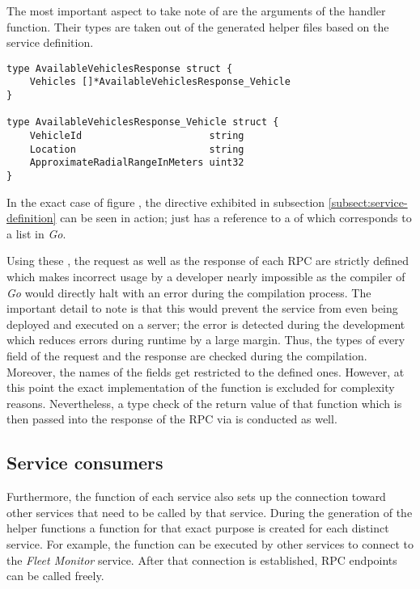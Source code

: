 \documentclass[12pt,a4paper,twoside]{report}
\begin{document}
The most important aspect to take note of are the arguments of the handler function.
Their types are taken out of the generated helper files based on the service definition.

\begin{lstlisting}[title=services/fleet-monitor/proto/fleet-monitor.pb.go, float, floatplacement=H]
type AvailableVehiclesResponse struct {
	Vehicles []*AvailableVehiclesResponse_Vehicle
}

type AvailableVehiclesResponse_Vehicle struct {
	VehicleId                      string
	Location                       string
	ApproximateRadialRangeInMeters uint32
}
\end{lstlisting}

In the exact case of figure ,
the  directive exhibited in subsection
\ref{subsect:service-definition} can be seen in action;
 just has a reference to a  of
 which corresponds to a list in \textit{Go}.

Using these , the request as well as the response of each RPC
are strictly defined which makes incorrect usage by a developer nearly impossible
as the compiler of \textit{Go} would directly halt with an error during the
compilation process.
The important detail to note is that this would prevent the service from
even being deployed and executed on a server; the error is detected during
the development which reduces errors during runtime by a large margin.
Thus, the types of every field of the request and the response are checked
during the compilation. Moreover, the names of the fields get restricted
to the defined ones.
However, at this point the exact implementation of the function
 is excluded for complexity reasons.
Nevertheless, a type check of the return value of that function which is then
passed into the response of the RPC via  is conducted as well.

\subsection{Service consumers}

Furthermore, the  function of each service also sets up
the connection toward other services that need to be called by that service.
During the generation of the helper functions a function for that exact purpose
is created for each distinct service.
For example, the function  can be executed by
other services to connect to the \textit{Fleet Monitor} service. After that
connection is established, RPC endpoints can be called freely.
\end{document}
